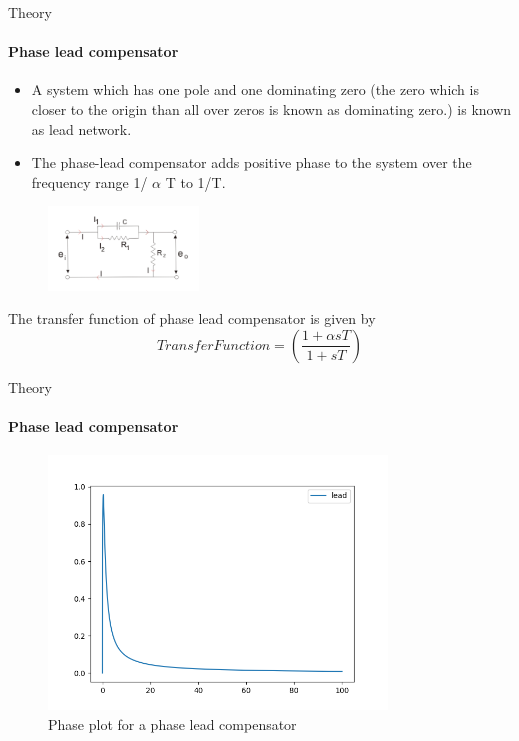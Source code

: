 \documentclass{beamer}
\begin{document}
\begin{frame}{Theory}
  \framesubtitle{Phase lead compensator}
\begin{itemize}
\item  A system which has one pole and one dominating zero (the zero which is closer to the origin than all over zeros is known as dominating zero.) is known as lead network. 
\item The phase-lead compensator adds positive phase to the system over the frequency range 1/ $\alpha$ T to 1/T. 
\end{itemize}
\begin{figure}[h]
\centering
\includegraphics[width=4cm]{Screenshot (25).png}
\end{figure}
The transfer function of phase lead compensator is given by
\[Transfer Function = (\frac{1+\alpha s T}{1+s T})\]
\end{frame}


\begin{frame}{Theory}
\framesubtitle{Phase lead compensator}
  \begin{figure}[h]
\centering
\includegraphics[width=9cm]{lead.png}
\caption{Phase plot for a phase lead compensator}
\end{figure}
\end{frame}
\end{document}
